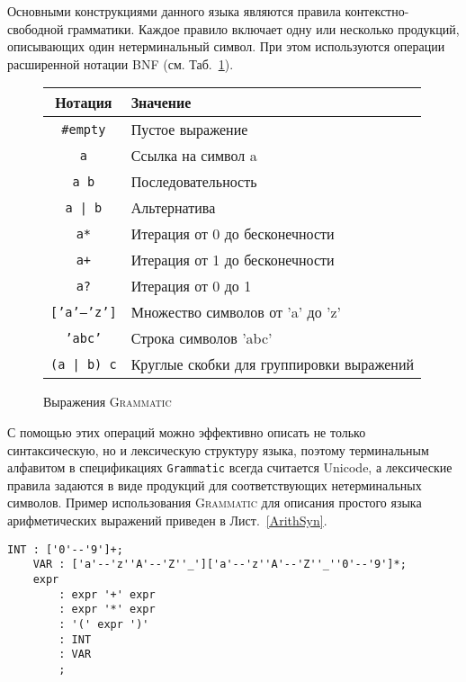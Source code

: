 \documentclass[12pt,a4paper]{article}
\newcommand{\lstref}[1]{Лист.~\ref{#1}}
\newcommand{\tabref}[1]{Таб.~\ref{#1}}
\newcommand{\code}[1]{\mbox{\texttt{#1}}}
\newcommand{\tool}[1]{\textsc{#1}}
\theoremstyle{definition}
\theoremstyle{plain}
\begin{document}
Основными конструкциями данного языка являются правила контекстно-свободной грамматики. Каждое правило включает одну или несколько продукций, описывающих один нетерминальный символ. При этом используются операции расширенной нотации BNF (см. \tabref{operations}). 
\begin{figure}[htbp]
\center
	\begin{tabular}{|c|l|}
	\hline
	\bf Нотация & \bf Значение \\
	\hline
	\code{\#empty} & Пустое выражение \\
	\code{a} & Ссылка на символ a \\
	\code{a b} & Последовательность \\
	\code{a | b} & Альтернатива \\
	\code{a*} & Итерация от 0 до бесконечности \\
	\code{a+} & Итерация от 1 до бесконечности \\
	\code{a?} & Итерация от 0 до 1 \\
	\code{['a'--'z']} & Множество символов от 'a' до 'z' \\
	\code{'abc'} & Строка символов 'abc' \\
	\code{(a | b) c} & Круглые скобки для группировки выражений \\
	\hline
	\end{tabular}
	\caption{Выражения \tool{Grammatic}}\label{operations}
\end{figure}
С помощью этих операций можно эффективно описать не только синтаксическую, но и лексическую структуру языка, поэтому терминальным алфавитом в спецификациях \code{Grammatic} всегда считается Unicode, а лексические правила задаются в виде продукций для соответствующих нетерминальных символов. Пример использования \tool{Grammatic} для описания простого языка арифметических выражений приведен в \lstref{ArithSyn}.
\begin{lstlisting}[float=htbp,label=ArithSyn,caption=Синтаксис языка арифметических выражений]
	INT : ['0'--'9']+;
	VAR : ['a'--'z''A'--'Z''_']['a'--'z''A'--'Z''_''0'--'9']*;
	expr
		: expr '+' expr
		: expr '*' expr
		: '(' expr ')'
		: INT
		: VAR
		;
\end{lstlisting}
\end{document}

